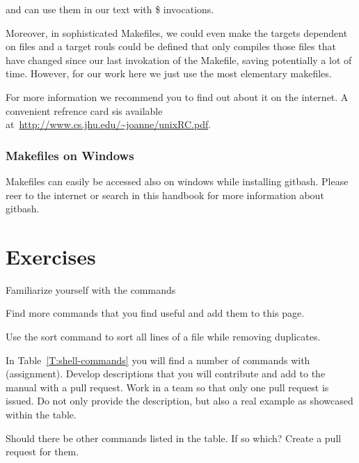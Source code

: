 and can use them in our text with \$ invocations.

Moreover, in sophisticated Makefiles, we could even make the targets
dependent on files and a target rouls could be defined that only
compiles those files that have changed since our last invokation of
the Makefile, saving potentially a lot of time. However, for our work
here we just use the most elementary makefiles.

For more information we recommend you to find out about it on the internet.
A convenient refrence card sis available at~\url{http://www.cs.jhu.edu/~joanne/unixRC.pdf}.


\subsubsection{Makefiles on Windows}

Makefiles can easily be accessed also on windows while installing
gitbash. Please reer to the internet or search in this handbook for
more information about gitbash.



\section{Exercises}

\begin{exercise}
\label{E:Linux.1}
Familiarize yourself with the commands
\end{exercise}

\begin{exercise}
\label{E:Linux.2}
Find more commands that you find useful and add them to this page.
\end{exercise}

\begin{exercise}
\label{E:Linux.3}
Use the sort command to sort all lines of a file while removing
duplicates.
\end{exercise}

\begin{exercise}
\label{E:Linux.4} In Table~\ref{T:shell-commands} you will find a number
  of commands with (assignment). Develop descriptions that you will
  contribute and add to the manual with a pull request. Work in a team
  so that only one pull request is issued. Do not only provide the
  description, but also a real example as showcased within the table.
\end{exercise}

\begin{exercise}
\label{E:Linux.4} Should there be other commands listed in the table. If
  so which? Create a pull request for them. 
\end{exercise}


\